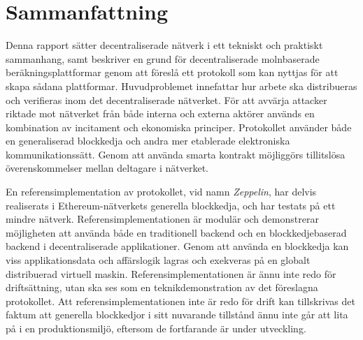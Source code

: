 
\thispagestyle{plain}			%
\section*{Sammanfattning}
Denna rapport sätter decentraliserade nätverk i ett tekniskt och praktiskt sammanhang, samt beskriver en grund för decentraliserade molnbaserade beräkningsplattformar genom att föreslå ett protokoll som kan nyttjas för att skapa sådana plattformar. Huvudproblemet innefattar hur arbete ska distribueras och verifieras inom det decentraliserade nätverket. För att avvärja attacker riktade mot nätverket från både interna och externa aktörer används en kombination av incitament och ekonomiska principer. Protokollet använder både en generaliserad blockkedja och andra mer etablerade elektroniska kommunikationssätt. Genom att använda smarta kontrakt möjliggörs tillitslösa överenskommelser mellan deltagare i nätverket.

En referensimplementation av protokollet, vid namn \textit{Zeppelin}, har delvis realiserats i Ethereum-nätverkets generella blockkedja, och har testats på ett mindre nätverk. Referensimplementationen är modulär och demonstrerar möjligheten att använda både en traditionell backend och en blockkedjebaserad backend i decentraliserade applikationer. Genom att använda en blockkedja kan viss applikationsdata och affärslogik lagras och exekveras på en globalt distribuerad virtuell maskin. Referensimplementationen är ännu inte redo för driftsättning, utan ska ses som en teknikdemonstration av det föreslagna protokollet. Att referensimplementationen inte är redo för drift kan tillskrivas det faktum att generella blockkedjor i sitt nuvarande tillstånd ännu inte går att lita på i en produktionsmiljö, eftersom de fortfarande är under utveckling.

\newpage				%
\thispagestyle{empty}
\mbox{}